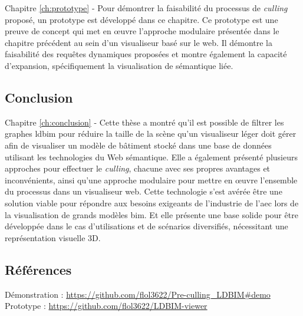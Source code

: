 \begin{refsection}
\begin{multicols}{2}
        \textsf{Chapitre \ref{ch:prototype} -}
        Pour démontrer la faisabilité du processus de \emph{culling} proposé, un prototype est développé dans ce chapitre. Ce prototype est une preuve de concept qui met en œuvre l'approche modulaire présentée dans le chapitre précédent au sein d'un visualiseur basé sur le web. Il démontre la faisabilité des requêtes dynamiques proposées et montre également la capacité d'expansion, spécifiquement la visualisation de sémantique liée.

        \subsection*{Conclusion}
        \textsf{Chapitre \ref{ch:conclusion} -} Cette thèse a montré qu'il est possible de filtrer les graphes \ac{ldbim} pour réduire la taille de la scène qu'un visualiseur léger doit gérer afin de visualiser un modèle de bâtiment stocké dans une base de données utilisant les technologies du Web sémantique. Elle a également présenté plusieurs approches pour effectuer le \emph{culling}, chacune avec ses propres avantages et inconvénients, ainsi qu'une approche modulaire pour mettre en œuvre l'ensemble du processus dans un visualiseur web. Cette technologie s'est avérée être une solution viable pour répondre aux besoins exigeants de l'industrie de l'\ac{aec} lors de la visualisation de grands modèles \ac{bim}. Et elle présente une base solide pour être développée dans le cas d'utilisations et de scénarios diversifiés, nécessitant une représentation visuelle 3D.
    \end{multicols}
    \subsection*{Références}
    \small
    {\renewcommand*{\bibfont}{\small}
        \printbibliography}

    \textsf{Démonstration :} \url{https://github.com/flol3622/Pre-culling_LDBIM#demo}\\
    \textsf{Prototype :} \url{https://github.com/flol3622/LDBIM-viewer}
\end{refsection}